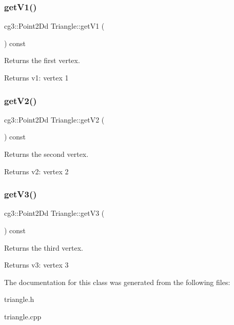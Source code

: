 \subsubsection{\texorpdfstring{get\+V1()}{getV1()}}
{\footnotesize\ttfamily cg3\+::\+Point2\+Dd Triangle\+::get\+V1 (\begin{DoxyParamCaption}{ }\end{DoxyParamCaption}) const}



Returns the first vertex. 

\begin{DoxyReturn}{Returns}
v1\+: vertex 1 
\end{DoxyReturn}
\mbox{\label{classTriangle_a6b22d833c2cc9b738793da637642bfd0}} 
\subsubsection{\texorpdfstring{get\+V2()}{getV2()}}
{\footnotesize\ttfamily cg3\+::\+Point2\+Dd Triangle\+::get\+V2 (\begin{DoxyParamCaption}{ }\end{DoxyParamCaption}) const}



Returns the second vertex. 

\begin{DoxyReturn}{Returns}
v2\+: vertex 2 
\end{DoxyReturn}
\mbox{\label{classTriangle_ad63dee82c3268c96bb5a6d353675c133}} 
\subsubsection{\texorpdfstring{get\+V3()}{getV3()}}
{\footnotesize\ttfamily cg3\+::\+Point2\+Dd Triangle\+::get\+V3 (\begin{DoxyParamCaption}{ }\end{DoxyParamCaption}) const}



Returns the third vertex. 

\begin{DoxyReturn}{Returns}
v3\+: vertex 3 
\end{DoxyReturn}


The documentation for this class was generated from the following files\+:\begin{DoxyCompactItemize}
\item 
triangle.\+h\item 
triangle.\+cpp\end{DoxyCompactItemize}
